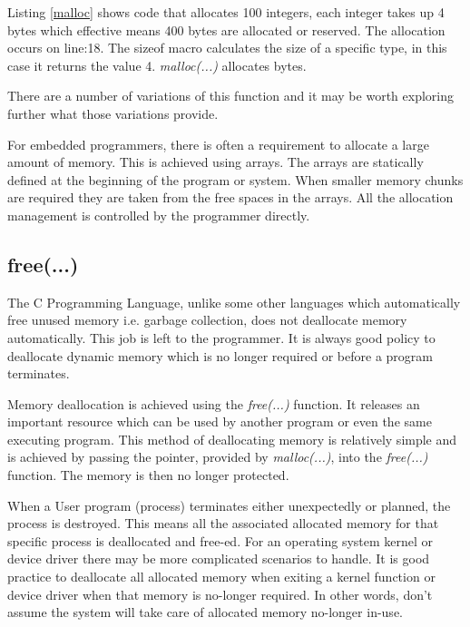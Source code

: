 Listing \ref{malloc} shows code that allocates 100 integers, each integer takes up 4 bytes which effective means 400 bytes are allocated or reserved. The allocation occurs on line:18. The sizeof macro calculates the size of a specific type, in this case it returns the value 4. \textit{malloc(...)} allocates bytes.

There are a number of variations of this function and it may be worth exploring further what those variations provide. 

For embedded programmers, there is often a requirement to allocate a large amount of memory. This is achieved using arrays. The arrays are statically defined at the beginning of the program or system. When smaller memory chunks are required they are taken from the free spaces in the arrays. All the allocation management is controlled by the programmer directly.

\subsection{free(...)}


The C Programming Language, unlike some other languages which automatically free unused memory i.e. garbage collection, does not deallocate memory automatically. This job is left to the programmer. It is always good policy to deallocate dynamic memory which is no longer required or before a program terminates. 

Memory deallocation is achieved using the \textit{free(...)} function. It releases an important resource which can be used by another program or even the same executing program. This method of deallocating memory is relatively simple and is achieved by passing the pointer, provided by \textit{malloc(...)}, into the \textit{free(...)} function. The memory is then no longer protected.

When a User program (process) terminates either unexpectedly or planned, the process is destroyed. This means all the associated allocated memory for that specific process is deallocated and free-ed. For an operating system kernel or device driver there may be more complicated scenarios to handle. It is good practice to deallocate all allocated memory when exiting a kernel function or device driver when that memory is no-longer required. In other words, don't assume the system will take care of allocated memory no-longer in-use.    

